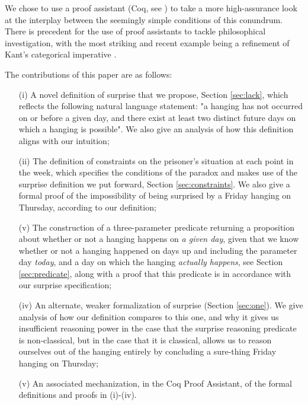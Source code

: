 \documentclass[runningheads]{llncs}
\begin{document}
We chose to use a proof
assistant (Coq, see \cite{coqmanual}) to take a more high-assurance look at the
interplay between the seemingly simple conditions of this conundrum.
There is precedent for the use of proof assistants to tackle philosophical
investigation, with the most striking and recent example
being a refinement of Kant's categorical imperative \cite{categoricalkant}.

  The contributions of this paper are as follows:

  \begin{itemize}
    \item[(i)] A novel definition of surprise that we propose,
    Section \ref{sec:lack}, which reflects
    the following natural language statement: "a hanging has not occurred on or before a given day,
    and there exist at least two distinct future days on which a hanging
    is possible". We
    also give an analysis of how this definition aligns with our intuition;

    \item[(ii)] The definition of constraints on the prisoner's situation at each
    point in the week, which specifies the conditions of the paradox and makes use
    of the surprise definition we put forward, Section \ref{sec:constraints}. We also
    give a formal proof of the impossibility of being surprised by a Friday hanging
    on Thursday, according to our definition;

    \item[(v)] The construction of a three-parameter predicate returning a proposition about
    whether or not a hanging happens on \emph{a given day}, given that we know whether or not a hanging
    happened on days up and including the parameter day \emph{today}, and a day on which the hanging
    \emph{actually happens}, see Section \ref{sec:predicate}, along with a proof that this predicate
    is in accordance with our surprise specification;

    \item[(iv)] An alternate, weaker formalization of surprise (Section \ref{sec:one}). We give analysis of how
    our definition compares to this one, and why it gives us insufficient reasoning
    power in the case that the surprise reasoning predicate is non-classical, but
    in the case that it is classical, allows us to reason ourselves out of the hanging entirely by concluding
    a sure-thing Friday hanging on Thursday;

    \item[(v)] An associated mechanization, in the Coq Proof Assistant, of the formal
    definitions and proofs in (i)-(iv).
  \end{itemize}
\end{document}
